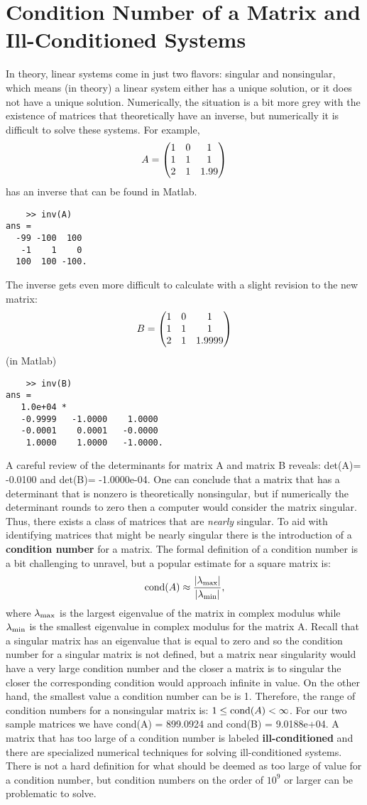 \documentclass[twoside]{article}
\def\ds{\displaystyle}
\begin{document}
\section{Condition Number of a Matrix and Ill-Conditioned Systems}
In theory, linear systems come in just two flavors: singular and nonsingular, which means (in theory) a linear system either has a unique solution, or it does not have a unique solution. Numerically, the situation is a bit more grey with the existence of matrices that theoretically have an inverse, but numerically it is difficult to solve these systems. For example, 
$$A = \begin{pmatrix} 1 & 0 & 1 \cr 1 & 1 & 1 \cr 2 & 1 & 1.99\end{pmatrix}$$
has an inverse that can be found in Matlab.
\begin{verbatim}
    >> inv(A)
ans =
  -99 -100  100
   -1    1    0
  100  100 -100.
\end{verbatim}
The inverse gets even more difficult to calculate with a slight revision to the new matrix:
$$B = \begin{pmatrix} 1 & 0 & 1 \cr 1 & 1 & 1 \cr 2 & 1 & 1.9999\end{pmatrix}$$
(in Matlab)
\begin{verbatim}
    >> inv(B)
ans =
   1.0e+04 *
   -0.9999   -1.0000    1.0000
   -0.0001    0.0001   -0.0000
    1.0000    1.0000   -1.0000.
\end{verbatim}
A careful review of the determinants for matrix A and matrix B reveals: det(A)= -0.0100 and det(B)= -1.0000e-04. One can conclude that a matrix that has a determinant that is nonzero is theoretically nonsingular, but if numerically the determinant rounds to zero then a computer would consider the matrix singular. Thus, there exists a class of matrices that are {\it nearly} singular. To aid with identifying matrices that might be nearly singular there is the introduction of a {\bf condition number} for a matrix. The formal definition of a condition number is a bit challenging to unravel, but a popular estimate for a square matrix is:
$${\rm cond}(A) \approx \frac {\vert \lambda_{\rm max}\vert }{\vert \lambda_{\rm min}\vert },$$
where $\ds \lambda_{\rm max}$ is the largest eigenvalue of the matrix in complex modulus while $\ds \lambda_{\rm min}$ is the smallest eigenvalue in complex modulus for the matrix A. Recall that a singular matrix has an eigenvalue that is equal to zero and so the condition number for a singular matrix is not defined, but a matrix near singularity would have a very large condition number and the closer a matrix is to singular the closer the corresponding condition would  approach infinite in value. On the other hand, the smallest value a condition number can be is 1. Therefore, the range of condition numbers for a nonsingular matrix is: $\ds 1 \le {\rm cond}(A) < \infty$. For our two sample matrices we have cond(A) = 899.0924 and cond(B) = 9.0188e+04. A matrix that has too large of a condition number is labeled {\bf ill-conditioned} and there are specialized numerical techniques for solving ill-conditioned systems. There is not a hard definition for what should be deemed as too large of value for a condition number, but condition numbers on the order of $10^9$ or larger can be problematic to solve. 
\end{document}
